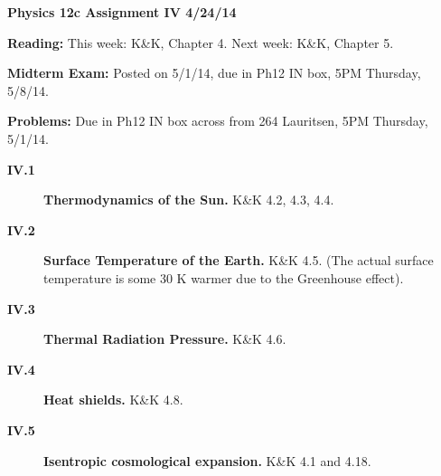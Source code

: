 \documentclass[11pt]{article}
\def\hb{\hfill\break}
\begin{document}
%
\centerline{\large\bf Physics 12c \hfill Assignment IV \hfill  4/24/14}

\medskip
\begin{list}{}{\leftmargin 2.4cm  .2cm }
\item[{\bf Reading:}  \hfill ] This week: K\&K, Chapter 4. \hb
                               Next week: K\&K, Chapter 5.
\item[{\bf Midterm Exam:} \hfill ] 
   Posted on 5/1/14, due in Ph12 IN box, 5PM Thursday, 5/8/14.
\item[{\bf Problems:} \hfill ] Due in Ph12 IN box across from 264 Lauritsen, 5PM  Thursday, 5/1/14.
\end{list}

\begin{description}

\item[{\bf IV.1} ] {\bf Thermodynamics of the Sun.} K\&K 4.2, 4.3, 4.4.

\item[{\bf IV.2} ] {\bf Surface Temperature of the Earth.} K\&K 4.5. \hb
(The actual surface temperature is some 30 K warmer due to the Greenhouse effect).

\item[{\bf IV.3} ] {\bf Thermal Radiation Pressure.} K\&K 4.6.

\item[{\bf IV.4} ] {\bf Heat shields.} K\&K 4.8.

\item[{\bf IV.5} ] {\bf Isentropic cosmological expansion.} K\&K 4.1 and 4.18.

\end{description}
\end{document}
